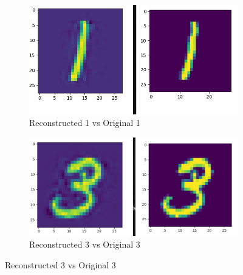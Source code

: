 \documentclass[a4paper,10pt]{article}
\begin{document}
 \begin{figure}[h]
 \begin{subfigure}{.5\textwidth}
 \centering
 \includegraphics[scale=0.4]{Results/SPAMS_X_ALL_K1024/lambdaopti_recons1.png}
  \caption{Reconstructed 1 vs Original 1}
 \end{subfigure}%
  \begin{subfigure}{.3\textwidth}
 \centering
 \includegraphics[scale=0.29]{Results/SPAMS_X_ALL_K1024/lambdaopti_recons3.png}
  \caption{Reconstructed 3 vs Original 3}

 \end{subfigure}%
\end{figure}
\newpage
\end{document}
